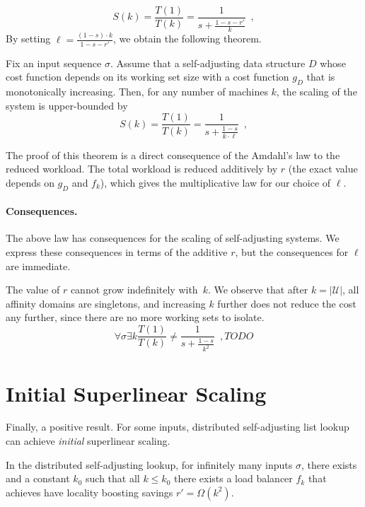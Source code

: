 \begin{equation*}
  S(k) = \frac{T(1)}{T(k)} = \frac1{s + \frac{1-s - r'}{k}} \enspace ,
\end{equation*}
By setting $\ell = \frac{(1-s)\cdot k}{1-s-r'}$, we obtain the following theorem.

\begin{theorem}
	\label{thm:superlinear}
	Fix an input sequence $\sigma$.
	Assume that a self-adjusting data structure $D$ whose cost function depends on its working set size with a cost function $g_D$ that is monotonically increasing. 
	Then, for any number of machines $k$, the scaling of the system is upper-bounded by
	\begin{equation*}
	  S(k) = \frac{T(1)}{T(k)} = \frac1{s + \frac{1-s}{k \cdot \ell}} \enspace ,
	\end{equation*}
\end{theorem}
The proof of this theorem is a direct consequence of the Amdahl's law to the reduced workload. The total workload is reduced additively by $r$ (the exact value depends on $g_D$ and $f_k$), which gives the multiplicative law for our choice of $\ell$.


\paragraph*{Consequences.}
The above law has consequences for the scaling of self-adjusting systems. We express these consequences in terms of the additive $r$, but the consequences for $\ell$ are immediate.

The value of $r$ cannot grow indefinitely with~$k$.
We observe that after $k = |\mathcal{U}|$, all affinity domains are singletons, and increasing $k$ further does not reduce the cost any further, since there are no more working sets to isolate.
\begin{equation*}\label{eq:mtf-perf}
 \forall \sigma \exists k \frac{T(1)}{T(k)} \neq \frac1{s + \frac{1-s}{k^2}} \enspace ,
 TODO
\end{equation*}



\section{Initial Superlinear Scaling}

Finally, a positive result.
For some inputs, distributed self-adjusting list lookup can achieve \emph{initial} superlinear scaling.

\begin{observation}
	\label{obs:list-k2}
	In the distributed self-adjusting lookup, 
	for infinitely many inputs $\sigma$, there exists  and a constant $k_0$ such that all $k \le k_0$ there exists a load balancer $f_k$ that achieves have locality boosting savings $r' = \Omega(k^2)$.
\end{observation}

